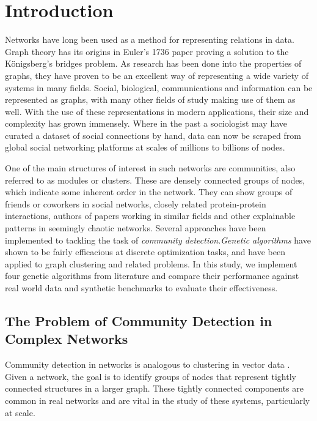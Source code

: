 \chapter{Introduction}
\label{ch:intro:introduction}
Networks have long been used as a method for representing relations in data. Graph theory has its origins in Euler's 1736 paper proving a solution to the K\"{o}nigsberg's bridges problem. As research has been done into the properties of graphs, they have proven to be an excellent way of representing a wide variety of systems in many fields. Social, biological, communications and information can be represented as graphs, with many other fields of study making use of them as well. With the use of these representations in modern applications, their size and complexity has grown immensely. Where in the past a sociologist may have curated a dataset of social connections by hand, data can now be scraped from global social networking platforms at scales of millions to billions of nodes. 

One of the main structures of interest in such networks are communities, also referred to as modules or clusters. These are densely connected groups of nodes, which indicate some inherent order in the network. They can show groups of friends or coworkers in social networks, closely related protein-protein interactions, authors of papers working in similar fields and other explainable patterns in seemingly chaotic networks. Several approaches have been implemented to tackling the task of \textit{community detection}.\textit{Genetic algorithms} have shown to be fairly efficacious at discrete optimization tasks, and have been applied to graph clustering and related problems. In this study, we implement four genetic algorithms from literature and compare their performance against real world data and synthetic benchmarks to evaluate their effectiveness.


\pagebreak

\section{The Problem of Community Detection in \\Complex Networks}
Community detection in networks is analogous to clustering in vector data \cite{Peel2016}. Given a network, the goal is to identify groups of nodes that represent tightly connected structures in a larger graph. These tightly connected components are common in real networks and are vital in the study of these systems, particularly at scale.

